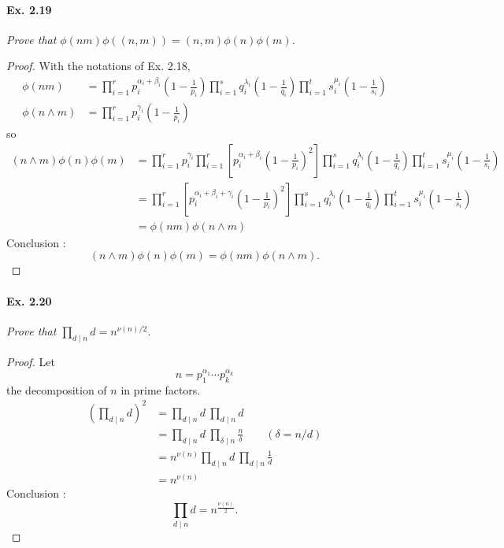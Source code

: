 \documentclass[11pt,a4paper]{article}
\begin{document}
{\paragraph{Ex. 2.19}

{\it Prove that $\phi(nm)\phi((n, m)) = (n, m)\phi(n)\phi(m)$.
}

\begin{proof}
With the  notations of Ex. 2.18,
\begin{align*}
\phi(nm) &= \prod_{i=1}^r p_i^{\alpha_i + \beta_i} \left( 1- \frac{1}{p_i}\right) \prod_{i=1}^s q_i^{\lambda_i} \left( 1- \frac{1}{q_i}\right) \prod_{i=1}^t s_i^{\mu_i} \left( 1- \frac{1}{s_i}\right)\\
\phi(n\wedge m) &= \prod_{i=1}^r p_i^{\gamma_i} \left( 1- \frac{1}{p_i}\right)
\end{align*}
so
\begin{align*}
(n\wedge m) \phi(n)\phi(m) &= \prod_{i=1}^r p_i^{\gamma_i} \prod_{i=1}^r \left [ p_i^{\alpha_i + \beta_i} \left( 1- \frac{1}{p_i}\right)^2 \right] \prod_{i=1}^s q_i^{\lambda_i} \left( 1- \frac{1}{q_i}\right) \prod_{i=1}^t s_i^{\mu_i} \left( 1- \frac{1}{s_i}\right)\\
&=  \prod_{i=1}^r \left [ p_i^{\alpha_i + \beta_i + \gamma_i} \left( 1- \frac{1}{p_i}\right)^2 \right] \prod_{i=1}^s q_i^{\lambda_i} \left( 1- \frac{1}{q_i}\right) \prod_{i=1}^t s_i^{\mu_i} \left( 1- \frac{1}{s_i}\right)\\
&=\phi(nm)\phi(n\wedge m)
\end{align*}
Conclusion : 
$$(n\wedge m) \phi(n)\phi(m) = \phi(nm)\phi(n\wedge m).$$
\end{proof}

\paragraph{Ex. 2.20}

{\it Prove that $\prod_{d \mid n} d = n^{\nu(n)/2}$.
}

\begin{proof}
Let $$n = p_1^{\alpha_1}\cdots p_k^{\alpha_k}$$ the decomposition of $n$ in prime factors.
\begin{align*}
\left( \prod_{d \mid n}d \right)^2 &=  \prod_{d \mid n} d \  \prod_{d \mid n} d \\
&= \prod_{d \mid n} d  \  \prod_{\delta \mid n} \frac{n}{\delta} \qquad (\delta = n/d)\\
&=n^{\nu(n)}  \prod_{d \mid n} d  \  \prod_{d \mid n} \frac{1}{d} \\
&=n^{\nu(n)}
\end{align*}
Conclusion :
$$\prod_{d \mid n} d = n^{\frac{\nu(n)}{2}}.$$
\end{proof}

}
\end{document}
